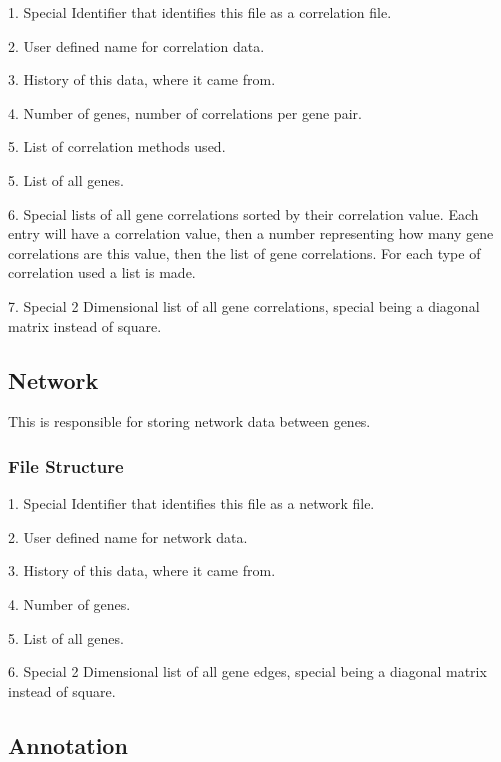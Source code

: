 \documentclass[10pt]{article}
\begin{document}
\begin{list}{}{}
\item[1.] Special Identifier that identifies this file as a correlation file.
\item[2.] User defined name for correlation data.
\item[3.] History of this data, where it came from.
\item[4.] Number of genes, number of correlations per gene pair.
\item[5.] List of correlation methods used.
\item[5.] List of all genes.
\item[6.] Special lists of all gene correlations sorted by their correlation 
value. Each entry will have a correlation value, then a number representing how 
many gene correlations are this value, then the list of gene correlations. For 
each type of correlation used a list is made.
\item[7.] Special 2 Dimensional list of all gene correlations, special being a 
diagonal matrix instead of square.
\end{list}

\subsection{Network}

This is responsible for storing network data between genes.

\subsubsection{File Structure}

\begin{list}{}{}
\item[1.] Special Identifier that identifies this file as a network file.
\item[2.] User defined name for network data.
\item[3.] History of this data, where it came from.
\item[4.] Number of genes.
\item[5.] List of all genes.
\item[6.] Special 2 Dimensional list of all gene edges, special being a 
diagonal matrix instead of square.
\end{list}

\subsection{Annotation}
\end{document}
